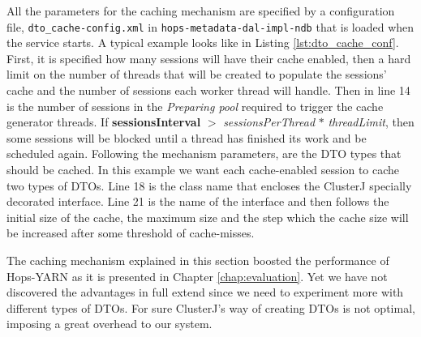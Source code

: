 

All the parameters for the caching mechanism are specified by a
configuration file, \texttt{dto\_cache-config.xml} in
\texttt{hops-metadata-dal-impl-ndb} that is loaded when
the service starts. A typical example looks like in Listing
\ref{lst:dto_cache_conf}. First, it is specified how many sessions
will have their cache enabled, then a hard limit on the number
of threads that will be created to populate the sessions' cache and
the number of sessions each worker thread will handle. Then in line 14
is the number of sessions in the \emph{Preparing pool} required to
trigger the cache generator threads. If \textbf{sessionsInterval}
$>$ \emph{sessionsPerThread} $*$ \emph{threadLimit}, then some
sessions will be blocked until a thread has finished its work and be
scheduled again. Following the mechanism parameters, are the DTO types
that should be cached. In this example we want each cache-enabled
session to cache two types of DTOs. Line 18 is the class name that
encloses the ClusterJ specially decorated interface. Line 21 is the
name of the interface and then follows the initial size of the cache,
the maximum size and the step which the cache size will be increased after some
threshold of cache-misses.

The caching mechanism explained in this section boosted the
performance of Hops-YARN as it is presented in Chapter \ref{chap:evaluation}. Yet
we have not discovered the advantages in full extend since we need to
experiment more with different types of DTOs. For sure ClusterJ's way
of creating DTOs is not optimal, imposing a great overhead to our system.